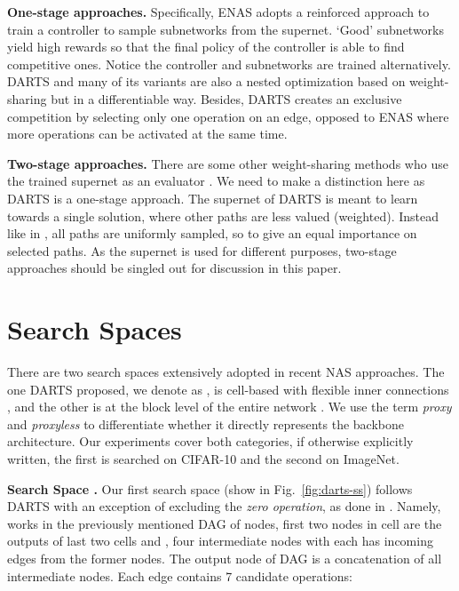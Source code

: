 \documentclass[runningheads]{llncs}
\begin{document}
\textbf{One-stage approaches.}
Specifically, ENAS \cite{pham2018efficient} adopts a reinforced approach to train a controller to sample subnetworks from the supernet. `Good' subnetworks yield high rewards so that the final policy of the controller is able to find competitive ones. Notice the controller and subnetworks are trained alternatively. DARTS \cite{liu2018darts} and many of its variants \cite{wu2018fbnet,xie2018snas,dong2019searching,chen2019progressive} are also a nested optimization based on weight-sharing but in a differentiable way. Besides, DARTS creates an exclusive competition by selecting only one operation on an edge, opposed to ENAS where more operations can be activated at the same time.

\textbf{Two-stage approaches.}
There are some other weight-sharing methods who use the trained supernet as an evaluator \cite{brock2017smash,bender2018understanding,guo2019single}. We need to make a distinction here as DARTS is a one-stage approach. The supernet of DARTS is meant to learn towards a single solution, where other paths are less valued (weighted). Instead like in \cite{guo2019single}, all paths are uniformly sampled, so to give an equal importance on selected paths. As the supernet is used for different purposes, two-stage approaches should be singled out for discussion in this paper. 




\section{Search Spaces}\label{sec:ss-supp}

There are two search spaces extensively adopted in recent NAS approaches. The one DARTS proposed, we denote as , is cell-based with flexible inner connections \cite{liu2018darts,chen2019progressive}, and the other  is at the block level of the entire network \cite{tan2018mnasnet,cai2018proxylessnas,wu2018fbnet}. We use the term \emph{proxy} and \emph{proxyless}  to differentiate whether it directly represents the backbone architecture. Our experiments cover both categories, if otherwise explicitly written, the first is searched on CIFAR-10 and the second on ImageNet. 

\textbf{Search Space .} Our first search space  (show in Fig.~\ref{fig:darts-ss}) follows DARTS \cite{liu2018darts} with an exception of excluding the \emph{zero operation}, as done in \cite{zela2020understanding}. Namely,  works in the previously mentioned DAG of  nodes, first two nodes in cell  are the outputs of last two cells  and , four intermediate nodes with each has incoming edges from the former nodes. The output node of DAG is a concatenation of all intermediate nodes. Each edge contains 7 candidate operations:
\end{document}

